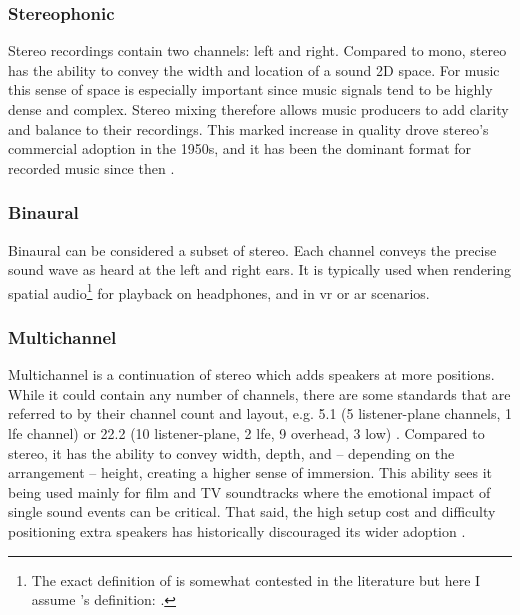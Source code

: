 \subsubsection*{Stereophonic}
Stereo recordings contain two channels: left and right. Compared to mono, stereo has the ability to convey the width and location of a sound 2D space. For music this sense of space is especially important since music signals tend to be highly dense and complex. Stereo mixing therefore allows music producers to add clarity and balance to their recordings. This marked increase in quality drove stereo's commercial adoption in the 1950s, and it has been the dominant format for recorded music since then \cite{lanierHIFITWOCHANNELCOMMOTION1957}.

\subsubsection*{Binaural}
Binaural can be considered a subset of stereo. Each channel conveys the precise sound wave as heard at the left and right ears. It is typically used when rendering spatial audio\footnote{The exact definition of  is somewhat contested in the literature but here I assume \citeauthor{cobosOverviewMachineLearning2022}'s definition: \textit{} \cite{cobosOverviewMachineLearning2022}.} for playback on headphones, and in \gls{vr} or \gls{ar} scenarios.

\subsubsection*{Multichannel}
Multichannel is a continuation of stereo which adds speakers at more positions. While it could contain any number of channels, there are some standards that are referred to by their channel count and layout, e.g. 5.1 (5 listener-plane channels, 1 \gls{lfe} channel) or 22.2 (10 listener-plane, 2 \gls{lfe}, 9 overhead, 3 low) \cite{sugimotoSpecificationAudioRepresentations2024}. Compared to stereo, it has the ability to convey width, depth, and -- depending on the arrangement -- height, creating a higher sense of immersion. This ability sees it being used mainly for film and TV soundtracks where the emotional impact of single sound events can be critical. That said, the high setup cost and difficulty positioning extra speakers has historically discouraged its wider adoption \cite{bayleySurroundSoundDAW2012}.

